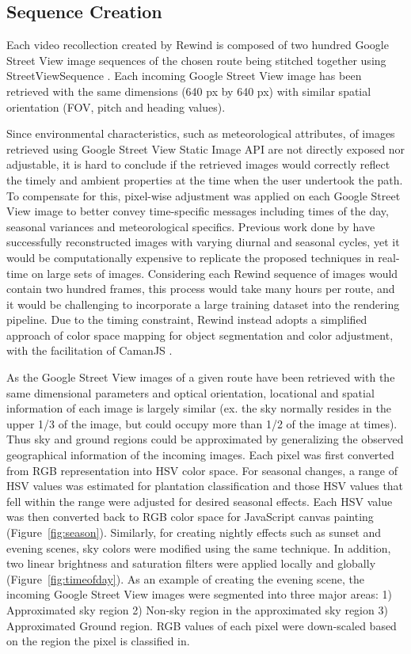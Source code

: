 \documentclass{sigchi}
\begin{document}
\subsection{Sequence Creation}
Each video recollection created by Rewind is composed of two hundred Google Street View image sequences of the chosen route being stitched together using StreetViewSequence \cite{streetviewsequence}. Each incoming Google Street View image has been retrieved with the same dimensions (640 px by 640 px) with similar spatial orientation (FOV, pitch and heading values).

Since environmental characteristics, such as meteorological attributes, of images retrieved using Google Street View Static Image API are not directly exposed nor adjustable, it is hard to conclude if the retrieved images would correctly reflect the timely and ambient properties at the time when the user undertook the path. To compensate for this, pixel-wise adjustment was applied on each Google Street View image to better convey time-specific messages including times of the day, seasonal variances and meteorological specifics. Previous work done by \cite{laffont2014transient,shih2013data} have successfully reconstructed images with varying diurnal and seasonal cycles, yet it would be computationally expensive to replicate the proposed techniques in real-time on large sets of images. Considering each Rewind sequence of images would contain two hundred frames, this process would take many hours per route, and it would be challenging to incorporate a large training dataset into the rendering pipeline. Due to the timing constraint, Rewind instead adopts a simplified approach of color space mapping for object segmentation and color adjustment, with the facilitation of CamanJS \cite{caman}.

As the Google Street View images of a given route have been retrieved with the same dimensional parameters and optical orientation, locational and spatial information of each image is largely similar (ex. the sky normally resides in the upper 1/3 of the image, but could occupy more than 1/2 of the image at times). Thus sky and ground regions could be approximated by generalizing the observed geographical information of the incoming images. Each pixel was first converted from RGB representation into HSV color space. For seasonal changes, a range of HSV values was estimated for plantation classification and those HSV values that fell within the range were adjusted for desired seasonal effects. Each HSV value was then converted back to RGB color space for JavaScript canvas painting (Figure~\ref{fig:season}). Similarly, for creating nightly effects such as sunset and evening scenes, sky colors were modified using the same technique. In addition, two linear brightness and saturation filters were applied locally and globally (Figure~\ref{fig:timeofday}). As an example of creating the evening scene, the incoming Google Street View images were segmented into three major areas: 1) Approximated sky region 2) Non-sky region in the approximated sky region 3) Approximated Ground region. RGB values of each pixel were down-scaled based on the region the pixel is classified in. 
\end{document}
